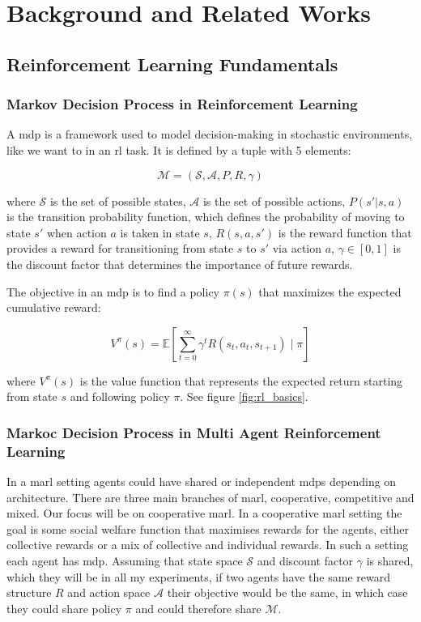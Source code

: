 \documentclass[UKenglish]{uiomasterthesis}
\begin{document}
\medskip
\chapter{Background and Related Works}

\section{Reinforcement Learning Fundamentals}
\subsection{Markov Decision Process in Reinforcement Learning}

A \ac{mdp} is a framework used to model decision-making in stochastic environments, like we want to in an \ac{rl} task. It is defined by a tuple with 5 elements:

\[
\mathcal{M} = (\mathcal{S}, \mathcal{A}, P, R, \gamma)
\]

where \(\mathcal{S}\) is the set of possible states, \(\mathcal{A}\) is the set of possible actions, \(P(s' | s, a)\) is the transition probability function, which defines the probability of moving to state \(s'\) when action \(a\) is taken in state \(s\), \(R(s, a, s')\) is the reward function that provides a reward for transitioning from state \(s\) to \(s'\) via action \(a\), \(\gamma \in [0,1]\) is the discount factor that determines the importance of future rewards.

The objective in an \ac{mdp} is to find a policy \(\pi(s)\) that maximizes the expected cumulative reward:

\[
V^\pi(s) = \mathbb{E} \left[ \sum_{t=0}^{\infty} \gamma^t R(s_t, a_t, s_{t+1}) \mid \pi \right]
\]

where \(V^\pi(s)\) is the value function that represents the expected return starting from state \(s\) and following policy \(\pi\). See figure \ref{fig:rl_basics}.


\subsection{Markoc Decision Process in Multi Agent Reinforcement Learning}
In a \ac{marl} setting agents could have shared or independent \acp{mdp} depending on architecture. There are three main branches of \ac{marl}, cooperative, competitive and mixed. Our focus will be on cooperative \ac{marl}.
In a cooperative \ac{marl} setting the goal is some social welfare function that maximises rewards for the agents, either collective rewards or a mix of collective and individual rewards. In such a setting each agent has \ac{mdp}. Assuming that state space \(\mathcal{S}\) and discount factor \(\gamma\) is shared, which they will be in all my experiments, if two agents have the same reward structure $R$ and action space \(\mathcal{A}\) their objective would be the same, in which case they could share policy \(\pi\) and could therefore share \(\mathcal{M}\).
\end{document}
